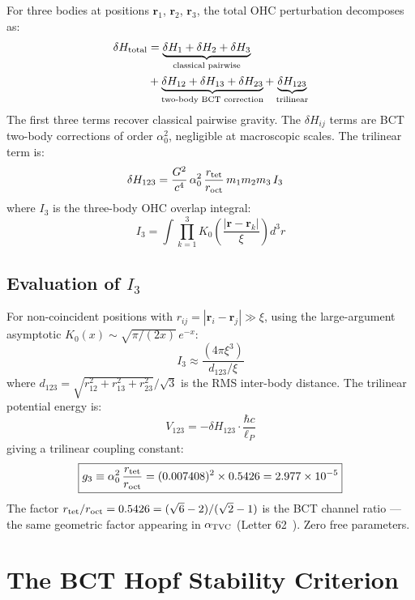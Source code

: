 \documentclass[twocolumn,10pt]{article}
\begin{document}
For three bodies at positions $\mathbf{r}_1$, $\mathbf{r}_2$, $\mathbf{r}_3$, the
total OHC perturbation decomposes as:
%
\begin{align}
\delta H_{\rm total} &= \underbrace{\delta H_1 + \delta H_2 + \delta H_3}_{\text{classical pairwise}}
\nonumber\\
&+ \underbrace{\delta H_{12} + \delta H_{13} + \delta H_{23}}_{\text{two-body BCT correction}}
+ \underbrace{\delta H_{123}}_{\text{trilinear}}
\end{align}
%
The first three terms recover classical pairwise gravity. The $\delta H_{ij}$ terms are
BCT two-body corrections of order $\alpha_0^2$, negligible at macroscopic scales. The
trilinear term is:
%
\begin{align}
\delta H_{123} &= \frac{G^2}{c^4}\,\alpha_0^2\,\frac{r_{\rm tet}}{r_{\rm oct}}\,
m_1 m_2 m_3\,I_3
\end{align}
%
where $I_3$ is the three-body OHC overlap integral:
%
\begin{equation}
I_3 = \int \prod_{k=1}^{3} K_0\!\left(\frac{|\mathbf{r}-\mathbf{r}_k|}{\xi}\right)d^3r
\end{equation}

\subsection{Evaluation of $I_3$}

For non-coincident positions with $r_{ij} = |\mathbf{r}_i - \mathbf{r}_j| \gg \xi$,
using the large-argument asymptotic $K_0(x) \sim \sqrt{\pi/(2x)}\,e^{-x}$:
%
\begin{equation}
I_3 \approx \frac{(4\pi\xi^3)}{d_{123}/\xi}
\end{equation}
%
where $d_{123} = \sqrt{r_{12}^2 + r_{13}^2 + r_{23}^2}/\sqrt{3}$ is the RMS inter-body
distance. The trilinear potential energy is:
%
\begin{equation}
V_{123} = -\delta H_{123} \cdot \frac{\hbar c}{\ell_P}
\end{equation}
%
giving a trilinear coupling constant:
%
\begin{equation}
\boxed{g_3 \equiv \alpha_0^2\,\frac{r_{\rm tet}}{r_{\rm oct}} 
= (0.007408)^2 \times 0.5426 = 2.977\times10^{-5}}
\end{equation}
%
The factor $r_{\rm tet}/r_{\rm oct} = 0.5426 = (\sqrt{6}-2)/(\sqrt{2}-1)$ is the BCT
channel ratio — the same geometric factor appearing in $\alpha_{\rm TVC}$
(Letter 62~\cite{bct_l62}). Zero free parameters.

\section{The BCT Hopf Stability Criterion}
\end{document}
